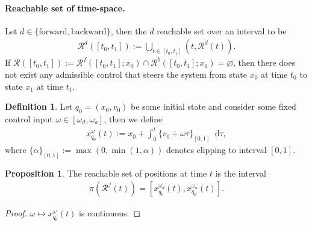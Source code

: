 \documentclass{article}
\theoremstyle{definition}
\newtheorem{define}{Definition}
\newtheorem{proposition}{Proposition}
\newcommand*\diff{\mathop{}\!\mathrm{d}}
\begin{document}
\paragraph{Reachable set of time-space.}
Let $d \in \{\mathrm{forward}, \mathrm{backward} \}$, then the $d$ reachable set
over an interval to be
\begin{align}
  \mathcal{R}^d([t_0, t_1]) := \bigcup_{t \in [t_0, t_1]} (t, \mathcal{R}^d(t)) .
\end{align}
%
If $\mathcal{R}([t_0, t_1]) := \mathcal{R}^f([t_0, t_1]; x_0) \cap \mathcal{R}^b([t_0, t_1]; x_1) = \varnothing$,
then there does not exist any admissible control that steers the system from
state $x_0$ at time $t_0$ to state $x_1$ at time $t_1$.

\newpage

\begin{define}
  Let $q_0 = (x_0, v_0)$ be some initial state and consider some fixed control
  input $\omega \in [\omega_d, \omega_a]$, then we define
  \begin{align}
    x_{q_0}^\omega(t) := x_0 + \int_0^t \{ v_0 + \omega \tau \}_{[0, 1]} \diff \tau ,
  \end{align}
  where ${\{ \alpha \}}_{[0,1]} := \max(0, \min(1, \alpha))$ denotes clipping to
  interval $[0, 1]$.
\end{define}

\begin{proposition}
  The reachable set of positions at time $t$ is the interval
  \begin{align}
    \pi(\mathcal{R}^f(t)) = [x^{\omega_d}_{q_0}(t), x^{\omega_a}_{q_0}(t)] .
  \end{align}
\end{proposition}
\begin{proof}
  $\omega \mapsto x_{q_0}^\omega(t)$ is continuous.
\end{proof}
\end{document}
